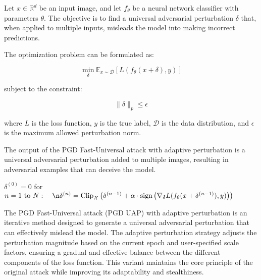 Let $x \in \mathbb{R}^d$ be an input image, and let $f_\theta$ be a neural network classifier with parameters $\theta$. The objective is to find a universal adversarial perturbation $\delta$ that, when applied to multiple inputs, misleads the model into making incorrect predictions. 

The optimization problem can be formulated as:

\[
\min_{\delta} \mathbb{E}_{x \sim \mathcal{D}} \left[ L(f_\theta(x + \delta), y) \right]
\]

subject to the constraint:

\[
\|\delta\|_p \leq \epsilon
\]

where $L$ is the loss function, $y$ is the true label, $\mathcal{D}$ is the data distribution, and $\epsilon$ is the maximum allowed perturbation norm.


The output of the PGD Fast-Universal attack with adaptive perturbation is a universal adversarial perturbation added to multiple images, resulting in adversarial examples that can deceive the model.

$\delta^{(0)} = 0$
for $n = 1 \text{ to } N: \quad\n\delta^{(n)} = \text{Clip}_{\mathcal{X}} \left( \delta^{(n-1)} + \alpha \cdot \text{sign} \left( \nabla_\delta L(f_\theta(x + \delta^{(n-1)}), y) \right) \right)$

The PGD Fast-Universal attack (PGD UAP) with adaptive perturbation is an iterative method designed to generate a universal adversarial perturbation that can effectively mislead the model. The adaptive perturbation strategy adjusts the perturbation magnitude based on the current epoch and user-specified scale factors, ensuring a gradual and effective balance between the different components of the loss function. This variant maintains the core principle of the original attack while improving its adaptability and stealthiness.